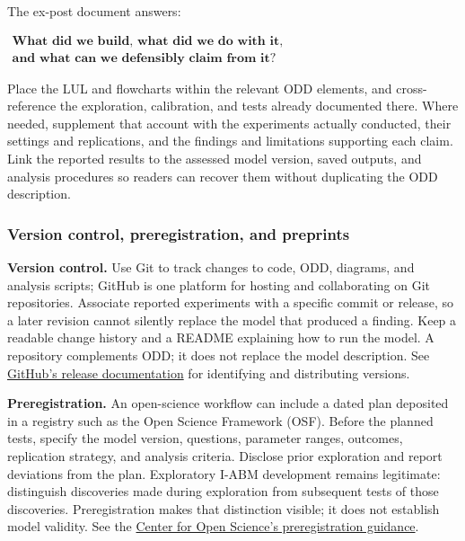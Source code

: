 \documentclass[11pt,a4paper]{article}
\newenvironment{fitdisplay}{\par\medskip\noindent\begin{lrbox}{\displaybox}$\displaystyle}{%
$\end{lrbox}\makebox[\linewidth][c]{\ifdim\wd\displaybox>\linewidth\resizebox{\linewidth}{!}{\usebox{\displaybox}}\else\usebox{\displaybox}\fi}\par\medskip}
\begin{document}
The ex-post document answers:
\begin{fitdisplay}
\boxed{\begin{gathered}
\textbf{What did we build, what did we do with it,}\\
\textbf{and what can we defensibly claim from it?}
\end{gathered}}
\end{fitdisplay}

Place the LUL and flowcharts within the relevant ODD elements, and cross-reference the exploration, calibration, and tests already documented there. Where needed, supplement that account with the experiments actually conducted, their settings and replications, and the findings and limitations supporting each claim. Link the reported results to the assessed model version, saved outputs, and analysis procedures so readers can recover them without duplicating the ODD description.

\subsubsection{Version control, preregistration, and preprints}

\textbf{Version control.} Use Git to track changes to code, ODD, diagrams, and analysis scripts; GitHub is one platform for hosting and collaborating on Git repositories. Associate reported experiments with a specific commit or release, so a later revision cannot silently replace the model that produced a finding. Keep a readable change history and a README explaining how to run the model. A repository complements ODD; it does not replace the model description. See \href{https://docs.github.com/en/repositories/releasing-projects-on-github/about-releases}{GitHub's release documentation} for identifying and distributing versions.

\textbf{Preregistration.} An open-science workflow can include a dated plan deposited in a registry such as the Open Science Framework (OSF). Before the planned tests, specify the model version, questions, parameter ranges, outcomes, replication strategy, and analysis criteria. Disclose prior exploration and report deviations from the plan. Exploratory I-ABM development remains legitimate: distinguish discoveries made during exploration from subsequent tests of those discoveries. Preregistration makes that distinction visible; it does not establish model validity. See the \href{https://www.cos.io/initiatives/prereg}{Center for Open Science's preregistration guidance}.
\end{document}
